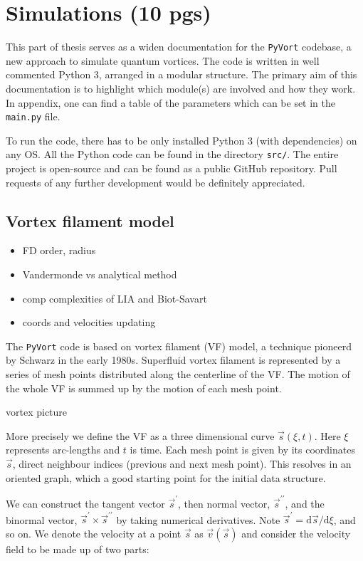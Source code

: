 \chapter{Simulations (10 pgs)}

This part of thesis serves as a widen documentation for the \texttt{PyVort} codebase, a new approach to simulate quantum vortices. The code is written in well commented Python 3, arranged in a modular structure. The primary aim of this documentation is to highlight which module(s) are involved and how they work.
In appendix, one can find a table of the parameters which can be set in the \texttt{main.py} file.

To run the code, there has to be only installed Python 3 (with dependencies) on any OS. All the Python code can be found in the directory \texttt{src/}. The entire project is open-source and can be found as a public GitHub repository. Pull requests of any further development would be definitely appreciated.

\section{Vortex filament model}
\begin{itemize}
	\item FD order, radius
	\item Vandermonde vs analytical method
	\item comp complexities of LIA and Biot-Savart
	\item coords and velocities updating
\end{itemize}

The \texttt{PyVort} code is based on vortex filament (VF) model, a technique pioneerd by Schwarz in the early 1980s. Superfluid vortex filament is represented by a series of mesh points distributed along the centerline of the VF. The motion of the whole VF is summed up by the motion of each mesh point.

\todo vortex picture

More precisely we define the VF as a three dimensional curve
$\vec{s}(\xi, t)$. Here $\xi$ represents arc-lengths and $t$ is time. Each mesh point is given by its coordinates $\vec{s}$, direct neighbour indices (previous and next mesh point). This resolves in an oriented graph, which a good starting point for the initial data structure.

We can construct the tangent vector $\vec{s}^{\prime}$, then normal vector, $\vec{s}^{\prime\prime}$, and the binormal vector, $\vec{s}^{\prime} \times \vec{s}^{\prime\prime}$ by taking numerical derivatives. Note $\vec{s}^{\prime} = \text{d}\vec{s} / \text{d}\xi$,
and so on. We denote the velocity at a point $\vec{s}$ as $\vec{v}(\vec{s})$ and consider the velocity field to be made up of two parts:

